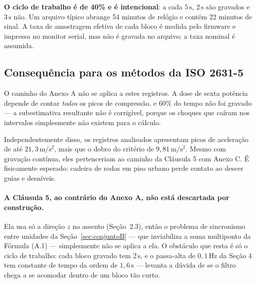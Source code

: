 \documentclass[11pt,a4paper]{article}
\newcommand{\unit}[2]{\ensuremath{#1\,\mathrm{#2}}}
\begin{document}
\textbf{O ciclo de trabalho é de 40\% e é intencional}: a cada \unit{5}{s},
\unit{2}{s} são gravados e \unit{3}{s} não. Um arquivo típico abrange 54 minutos
de relógio e contém 22 minutos de sinal. A taxa de amostragem efetiva de cada
bloco é medida pelo firmware e impressa no monitor serial, mas não é gravada no
arquivo; a taxa nominal é assumida.

\subsection{Consequência para os métodos da ISO 2631-5}

O caminho do Anexo A não se aplica a estes registros. A dose de sexta potência
depende de contar \emph{todos} os picos de compressão, e 60\% do tempo não foi
gravado --- a subestimativa resultante não é corrigível, porque os choques que
caíram nos intervalos simplesmente não existem para o cálculo.

Independentemente disso, os registros analisados apresentam picos de
aceleração de até \unit{21{,}3}{m/s^2}, mais que o dobro do critério de
\unit{9{,}81}{m/s^2}. Mesmo com gravação contínua, eles pertenceriam ao caminho
da Cláusula 5 com Anexo C. É fisicamente esperado: cadeira de rodas em piso
urbano perde contato ao descer guias e desníveis.

\paragraph{A Cláusula 5, ao contrário do Anexo A, não está descartada por
construção.} Ela usa só a direção $z$ no assento (Seção~2.3), então o
problema de sincronismo entre unidades da Seção~\ref{sec:conjuntoB} --- que
inviabiliza a soma multiponto da Fórmula (A.1) --- simplesmente não se aplica
a ela. O obstáculo que resta é só o ciclo de trabalho: cada bloco gravado tem
\unit{2}{s}, e o passa-alta de \unit{0{,}1}{Hz} da Seção 4 tem constante de
tempo da ordem de \unit{1{,}6}{s} --- levanta a dúvida de se o filtro chega a
se acomodar dentro de um bloco tão curto.
\end{document}
